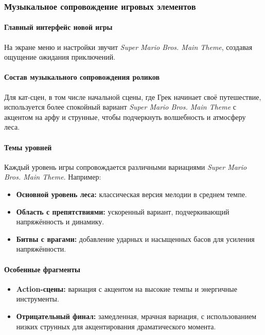\documentclass{article}
\begin{document}
\subsubsection{Музыкальное сопровождение игровых элементов}
\paragraph{Главный интерфейс новой игры}  
На экране меню и настройки звучит \textit{Super Mario Bros. Main Theme}, создавая ощущение ожидания приключений.

\paragraph{Состав музыкального сопровождения роликов}  
Для кат-сцен, в том числе начальной сцены, где Грек начинает своё путешествие, используется более спокойный вариант \textit{Super Mario Bros. Main Theme} с акцентом на арфу и струнные, чтобы подчеркнуть волшебность и атмосферу леса.

\paragraph{Темы уровней}  
Каждый уровень игры сопровождается различными вариациями \textit{Super Mario Bros. Main Theme}. Например:  
\begin{itemize}
    \item \textbf{Основной уровень леса:} классическая версия мелодии в среднем темпе.  
    \item \textbf{Область с препятствиями:} ускоренный вариант, подчеркивающий напряжённость и динамику.  
    \item \textbf{Битвы с врагами:} добавление ударных и насыщенных басов для усиления напряжённости.  
\end{itemize}

\paragraph{Особенные фрагменты}  
\begin{itemize}
    \item \textbf{Action-сцены:} вариация с акцентом на высокие темпы и энергичные инструменты.  
    \item \textbf{Отрицательный финал:} замедленная, мрачная вариация, с использованием низких струнных для акцентирования драматического момента.  
\end{itemize}
\end{document}
